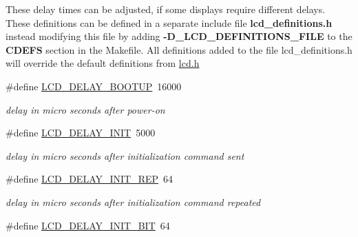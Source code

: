 These delay times can be adjusted, if some displays require different delays.~\newline
 These definitions can be defined in a separate include file {\bfseries lcd\+\_\+definitions.\+h} instead modifying this file by adding {\bfseries -\/\+D\+\_\+\+L\+C\+D\+\_\+\+D\+E\+F\+I\+N\+I\+T\+I\+O\+N\+S\+\_\+\+F\+I\+LE} to the {\bfseries C\+D\+E\+FS} section in the Makefile. All definitions added to the file lcd\+\_\+definitions.\+h will override the default definitions from \hyperlink{lcd_8h}{lcd.\+h} \begin{DoxyCompactItemize}
\item 
\#define \hyperlink{group__pfleury__lcd_ga79ca3fe83448ab158a4c566bf292c260}{L\+C\+D\+\_\+\+D\+E\+L\+A\+Y\+\_\+\+B\+O\+O\+T\+UP}~16000\hypertarget{group__pfleury__lcd_ga79ca3fe83448ab158a4c566bf292c260}{}\label{group__pfleury__lcd_ga79ca3fe83448ab158a4c566bf292c260}

\begin{DoxyCompactList}\small\item\em delay in micro seconds after power-\/on \end{DoxyCompactList}\item 
\#define \hyperlink{group__pfleury__lcd_gab6ba3c8cdcf1a96b0d4c476eff8f8617}{L\+C\+D\+\_\+\+D\+E\+L\+A\+Y\+\_\+\+I\+N\+IT}~5000\hypertarget{group__pfleury__lcd_gab6ba3c8cdcf1a96b0d4c476eff8f8617}{}\label{group__pfleury__lcd_gab6ba3c8cdcf1a96b0d4c476eff8f8617}

\begin{DoxyCompactList}\small\item\em delay in micro seconds after initialization command sent \end{DoxyCompactList}\item 
\#define \hyperlink{group__pfleury__lcd_ga2ce1ac9b146b7baa7169e27f9cf3a99e}{L\+C\+D\+\_\+\+D\+E\+L\+A\+Y\+\_\+\+I\+N\+I\+T\+\_\+\+R\+EP}~64\hypertarget{group__pfleury__lcd_ga2ce1ac9b146b7baa7169e27f9cf3a99e}{}\label{group__pfleury__lcd_ga2ce1ac9b146b7baa7169e27f9cf3a99e}

\begin{DoxyCompactList}\small\item\em delay in micro seconds after initialization command repeated \end{DoxyCompactList}\item 
\#define \hyperlink{group__pfleury__lcd_gadf773dcbd0827cd15c788065c9197459}{L\+C\+D\+\_\+\+D\+E\+L\+A\+Y\+\_\+\+I\+N\+I\+T\+\_\+B\+IT}~64\hypertarget{group__pfleury__lcd_gadf773dcbd0827cd15c788065c9197459}{}\label{group__pfleury__lcd_gadf773dcbd0827cd15c788065c9197459}


\end{DoxyCompactItemize}
